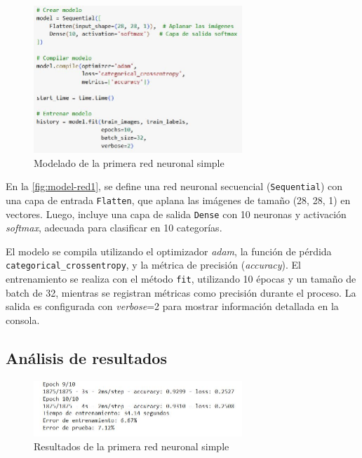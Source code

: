 \begin{figure}[H]
	\centering
	\includegraphics[width=0.7\textwidth]{imgs/model-red1.JPG}
	\caption{Modelado de la primera red neuronal simple}
	\label{fig:model-red1}
\end{figure}

En la \autoref{fig:model-red1}, se define una red neuronal secuencial (\texttt{Sequential}) con una capa de entrada \texttt{Flatten}, que aplana las imágenes de tamaño (28, 28, 1) en vectores. Luego, incluye una capa de salida \texttt{Dense} con 10 neuronas y activación \textit{softmax}, adecuada para clasificar en 10 categorías.

El modelo se compila utilizando el optimizador \textit{adam}, la función de pérdida \texttt{categorical\_crossentropy}, y la métrica de precisión (\textit{accuracy}). El entrenamiento se realiza con el método \texttt{fit}, utilizando 10 épocas y un tamaño de batch de 32, mientras se registran métricas como precisión durante el proceso. La salida es configurada con \textit{verbose}=2 para mostrar información detallada en la consola.

\subsection{Análisis de resultados}

\begin{figure}[H]
	\centering
	\includegraphics[width=0.7\textwidth]{imgs/results-red1.JPG}
	\caption{Resultados de la primera red neuronal simple}
	\label{fig:results-red1}
\end{figure}


